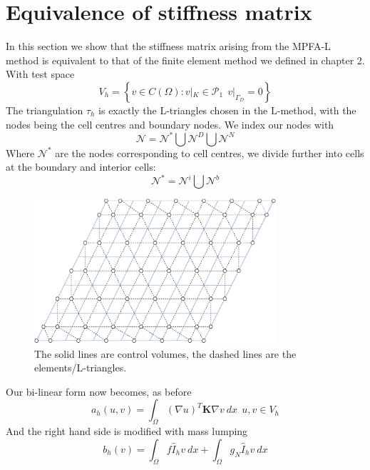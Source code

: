\documentclass[../Main/main.tex]{subfiles}
\begin{document}
	\section*{Equivalence of stiffness matrix}
	In this section we show that the stiffness matrix arising from the MPFA-L method is equivalent to that of the finite element method we defined in chapter 2. With test space
	\begin{equation}
		V_h = \left \{ v \in C(\Omega): v|_K\in \mathcal{P}_1 \ \ v|_{\Gamma_D}=0 \right \}
	\end{equation}
	The triangulation $\tau_h$ is exactly the L-triangles chosen in the L-method, with the nodes being the cell centres and boundary nodes. We index our nodes with 
	\begin{equation}
		\mathcal{N} = \mathcal{N}^* \bigcup \mathcal{N}^D\bigcup \mathcal{N}^N
	\end{equation}
	Where $\mathcal{N}^*$ are the nodes corresponding to cell centres, we divide further into cells at the boundary and interior cells:
	\begin{equation}
		\mathcal{N}^* = \mathcal{N}^i \bigcup \mathcal{N}^b
	\end{equation}
	\begin{figure}[H]
		\centering
		\includegraphics[width=0.8\textwidth]{grid.pdf}
		\caption{The solid lines are control volumes, the dashed lines are the elements/L-triangles.}
	\end{figure}
	Our bi-linear form now becomes, as before
	\begin{equation}\label{eq:bi linear}
		a_h(u,v) = \int_{\Omega}(\nabla u)^T \pmb{K}\nabla v \ dx \ \ u,v \in V_h
	\end{equation}
	And the right hand side is modified with mass lumping 
	\begin{equation}
		b_h(v) = \int_{\Omega} f \hat{I}_h v \ dx + \int_{\Omega }g_N \hat{I}_h v \ dx
	\end{equation}
\end{document}
